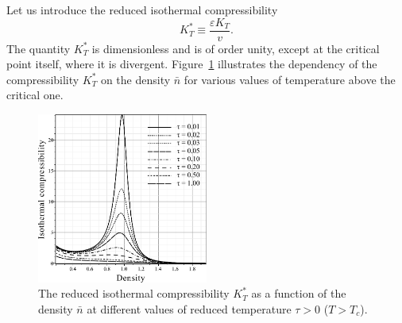 \documentclass[12pt]{article}
\begin{document}
	Let us introduce the reduced isothermal compressibility
	\begin{equation}
		K^*_T \equiv \frac{\varepsilon K_T}{v}.
	\end{equation}
	The quantity $K^*_T$ is dimensionless and is of order unity, except at the critical point itself, where it is divergent. Figure~\ref{fig2a} illustrates the dependency of the compressibility $K^*_T$ on the density $\bar{n}$ for various values of temperature above the critical one.
	
	\begin{figure}[h!]
		\centering \includegraphics[width=0.5\textwidth]{f2a.pdf}
		\vskip-3mm\caption{The reduced isothermal compressibility $K^*_T$ as a function of the density $\bar n$ at different values of reduced temperature $\tau > 0$ ($T > T_c$). 
		}\label{fig2a}
	\end{figure}
	
\end{document}
